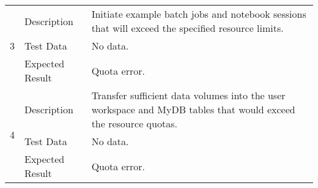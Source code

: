 \begin{longtable}[]{p{1.3cm}p{2cm}p{13cm}}
            \multirow{3}{*}{ 3 } & Description &
            \begin{minipage}[t]{13cm}{\footnotesize
            Initiate example batch jobs and notebook sessions that will exceed the
specified resource limits.

            \vspace{\dp0}
            } \end{minipage} \\ \cline{2-3}
            & Test Data &
            \begin{minipage}[t]{13cm}{\footnotesize
                No data.
                \vspace{\dp0}
            } \end{minipage} \\ \cline{2-3}
            & Expected Result &
                \begin{minipage}[t]{13cm}{\footnotesize
                Quota error.

                \vspace{\dp0}
                } \end{minipage}
        \\ \midrule

            \multirow{3}{*}{ 4 } & Description &
            \begin{minipage}[t]{13cm}{\footnotesize
            Transfer sufficient data volumes into the user workspace and MyDB tables
that would exceed the resource quotas.

            \vspace{\dp0}
            } \end{minipage} \\ \cline{2-3}
            & Test Data &
            \begin{minipage}[t]{13cm}{\footnotesize
                No data.
                \vspace{\dp0}
            } \end{minipage} \\ \cline{2-3}
            & Expected Result &
                \begin{minipage}[t]{13cm}{\footnotesize
                Quota error.

                \vspace{\dp0}
                } \end{minipage}
        \\ \midrule


\end{longtable}
